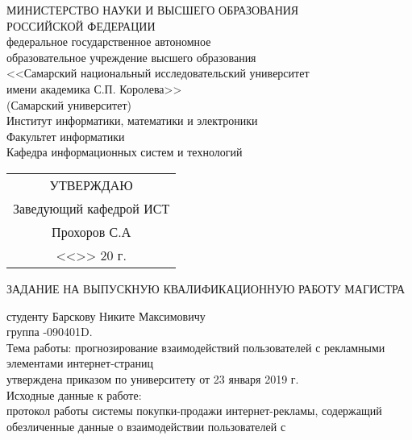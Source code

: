 \begin{center}
МИНИСТЕРСТВО НАУКИ И ВЫСШЕГО ОБРАЗОВАНИЯ \\
РОССИЙСКОЙ ФЕДЕРАЦИИ\vspace{14pt} \\
федеральное государственное автономное \\
образовательное учреждение высшего образования \\
<<Самарский национальный исследовательский университет \\
имени академика С.П. Королева>> \\
(Самарский университет)\vspace{14pt} \\
Институт информатики, математики и электроники \\
Факультет информатики \\
Кафедра информационных систем и технологий\vspace{28pt} \\
\end{center}
\begin{flushright}
    \begin{tabular}{@{}c@{}}
        \onehalfspacing{}
        УТВЕРЖДАЮ\\
        Заведующий кафедрой ИСТ\\
        \underline{\hspace{4cm}} Прохоров С.А\\
        <<\underline{\hspace{0.75cm}}>> \underline{\hspace{4.13cm}} 20\underline{\hspace{0.75cm}} г.
    \end{tabular}
\end{flushright}\vspace{28pt}
\begin{center}
    ЗАДАНИЕ НА ВЫПУСКНУЮ КВАЛИФИКАЦИОННУЮ РАБОТУ МАГИСТРА
\end{center}\vspace{14pt}
\onehalfspacing{}
студенту Барскову Никите Максимовичу \\
группа -090401D. \\
Тема работы: прогнозирование взаимодействий пользователей с рекламными элементами интернет-страниц \\
утверждена приказом по университету  от 23 января 2019 г. \\
Исходные данные к работе: \\
протокол работы системы покупки-продажи интернет-рекламы, содержащий обезличенные данные о взаимодействии пользователей с
